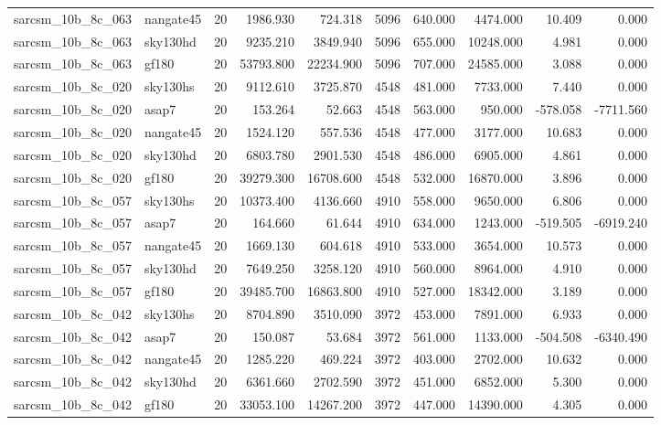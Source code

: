 \begin{longtable}{llrrrrrrrr}
sarcsm\_10b\_8c\_063 & nangate45 & 20 & 1986.930 & 724.318 & 5096 & 640.000 & 4474.000 & 10.409 & 0.000 \\
sarcsm\_10b\_8c\_063 & sky130hd & 20 & 9235.210 & 3849.940 & 5096 & 655.000 & 10248.000 & 4.981 & 0.000 \\
sarcsm\_10b\_8c\_063 & gf180 & 20 & 53793.800 & 22234.900 & 5096 & 707.000 & 24585.000 & 3.088 & 0.000 \\
sarcsm\_10b\_8c\_020 & sky130hs & 20 & 9112.610 & 3725.870 & 4548 & 481.000 & 7733.000 & 7.440 & 0.000 \\
sarcsm\_10b\_8c\_020 & asap7 & 20 & 153.264 & 52.663 & 4548 & 563.000 & 950.000 & -578.058 & -7711.560 \\
sarcsm\_10b\_8c\_020 & nangate45 & 20 & 1524.120 & 557.536 & 4548 & 477.000 & 3177.000 & 10.683 & 0.000 \\
sarcsm\_10b\_8c\_020 & sky130hd & 20 & 6803.780 & 2901.530 & 4548 & 486.000 & 6905.000 & 4.861 & 0.000 \\
sarcsm\_10b\_8c\_020 & gf180 & 20 & 39279.300 & 16708.600 & 4548 & 532.000 & 16870.000 & 3.896 & 0.000 \\
sarcsm\_10b\_8c\_057 & sky130hs & 20 & 10373.400 & 4136.660 & 4910 & 558.000 & 9650.000 & 6.806 & 0.000 \\
sarcsm\_10b\_8c\_057 & asap7 & 20 & 164.660 & 61.644 & 4910 & 634.000 & 1243.000 & -519.505 & -6919.240 \\
sarcsm\_10b\_8c\_057 & nangate45 & 20 & 1669.130 & 604.618 & 4910 & 533.000 & 3654.000 & 10.573 & 0.000 \\
sarcsm\_10b\_8c\_057 & sky130hd & 20 & 7649.250 & 3258.120 & 4910 & 560.000 & 8964.000 & 4.910 & 0.000 \\
sarcsm\_10b\_8c\_057 & gf180 & 20 & 39485.700 & 16863.800 & 4910 & 527.000 & 18342.000 & 3.189 & 0.000 \\
sarcsm\_10b\_8c\_042 & sky130hs & 20 & 8704.890 & 3510.090 & 3972 & 453.000 & 7891.000 & 6.933 & 0.000 \\
sarcsm\_10b\_8c\_042 & asap7 & 20 & 150.087 & 53.684 & 3972 & 561.000 & 1133.000 & -504.508 & -6340.490 \\
sarcsm\_10b\_8c\_042 & nangate45 & 20 & 1285.220 & 469.224 & 3972 & 403.000 & 2702.000 & 10.632 & 0.000 \\
sarcsm\_10b\_8c\_042 & sky130hd & 20 & 6361.660 & 2702.590 & 3972 & 451.000 & 6852.000 & 5.300 & 0.000 \\
sarcsm\_10b\_8c\_042 & gf180 & 20 & 33053.100 & 14267.200 & 3972 & 447.000 & 14390.000 & 4.305 & 0.000 \\

\end{longtable}
